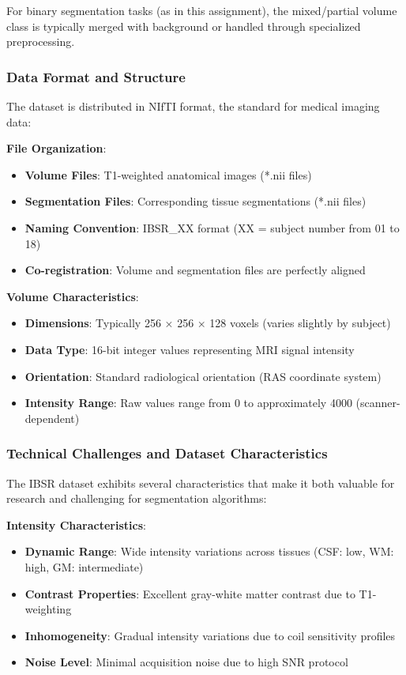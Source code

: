 \documentclass[12pt,a4paper]{article}
\begin{document}
For binary segmentation tasks (as in this assignment), the mixed/partial volume class is typically merged with background or handled through specialized preprocessing.

\subsubsection{Data Format and Structure}

The dataset is distributed in NIfTI format, the standard for medical imaging data:

\textbf{File Organization}:
\begin{itemize}
    \item \textbf{Volume Files}: T1-weighted anatomical images (*.nii files)
    \item \textbf{Segmentation Files}: Corresponding tissue segmentations (*.nii files)
    \item \textbf{Naming Convention}: IBSR\_XX format (XX = subject number from 01 to 18)
    \item \textbf{Co-registration}: Volume and segmentation files are perfectly aligned
\end{itemize}

\textbf{Volume Characteristics}:
\begin{itemize}
    \item \textbf{Dimensions}: Typically 256 × 256 × 128 voxels (varies slightly by subject)
    \item \textbf{Data Type}: 16-bit integer values representing MRI signal intensity
    \item \textbf{Orientation}: Standard radiological orientation (RAS coordinate system)
    \item \textbf{Intensity Range}: Raw values range from 0 to approximately 4000 (scanner-dependent)
\end{itemize}

\subsubsection{Technical Challenges and Dataset Characteristics}

The IBSR dataset exhibits several characteristics that make it both valuable for research and challenging for segmentation algorithms:

\textbf{Intensity Characteristics}:
\begin{itemize}
    \item \textbf{Dynamic Range}: Wide intensity variations across tissues (CSF: low, WM: high, GM: intermediate)
    \item \textbf{Contrast Properties}: Excellent gray-white matter contrast due to T1-weighting
    \item \textbf{Inhomogeneity}: Gradual intensity variations due to coil sensitivity profiles
    \item \textbf{Noise Level}: Minimal acquisition noise due to high SNR protocol
\end{itemize}
\end{document}
